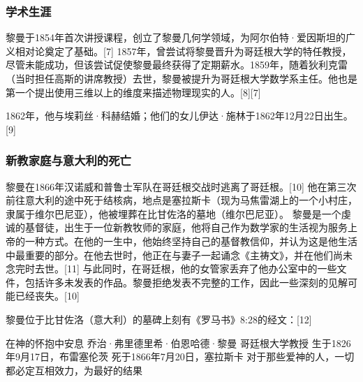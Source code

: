 \subsubsection{学术生涯}  
黎曼于1854年首次讲授课程，创立了黎曼几何学领域，为阿尔伯特·爱因斯坦的广义相对论奠定了基础。[7] 1857年，曾尝试将黎曼晋升为哥廷根大学的特任教授，尽管未能成功，但该尝试促使黎曼最终获得了定期薪水。1859年，随着狄利克雷（当时担任高斯的讲席教授）去世，黎曼被提升为哥廷根大学数学系主任。他也是第一个提出使用三维以上的维度来描述物理现实的人。[8][7]

1862年，他与埃莉丝·科赫结婚；他们的女儿伊达·施林于1862年12月22日出生。[9]
\subsubsection{新教家庭与意大利的死亡}
黎曼在1866年汉诺威和普鲁士军队在哥廷根交战时逃离了哥廷根。[10] 他在第三次前往意大利的途中死于结核病，地点是塞拉斯卡（现为马焦雷湖上的一个小村庄，隶属于维尔巴尼亚），他被埋葬在比甘佐洛的墓地（维尔巴尼亚）。  
黎曼是一个虔诚的基督徒，出生于一位新教牧师的家庭，他将自己作为数学家的生活视为服务上帝的一种方式。在他的一生中，他始终坚持自己的基督教信仰，并认为这是他生活中最重要的部分。在他去世时，他正在与妻子一起诵念《主祷文》，并在他们尚未念完时去世。[11] 与此同时，在哥廷根，他的女管家丢弃了他办公室中的一些文件，包括许多未发表的作品。黎曼拒绝发表不完整的工作，因此一些深刻的见解可能已经丧失。[10]

黎曼位于比甘佐洛（意大利）的墓碑上刻有《罗马书》8:28的经文：[12]

在神的怀抱中安息
乔治·弗里德里希·伯恩哈德·黎曼
哥廷根大学教授
生于1826年9月17日，布雷塞伦茨
死于1866年7月20日，塞拉斯卡
对于那些爱神的人，一切都必定互相效力，为最好的结果
